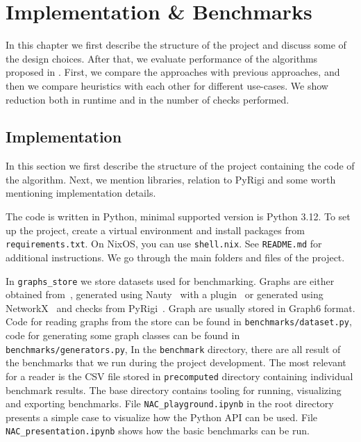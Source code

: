 \chapter{Implementation \& Benchmarks}%
\label{chapter:benchmarks}

\begin{chapterabstract}

	In this chapter we first describe the structure of the project
	and discuss some of the design choices.
	After that, we evaluate performance of the algorithms
	proposed in .
	First, we compare the approaches with previous approaches,
	and then we compare heuristics with each other
	for different use-cases.
	We show reduction both in runtime and in the number
	of \IsNACColoring{} checks performed.

\end{chapterabstract}

\section{Implementation}


In this section we first describe the structure of the project containing
the code of the algorithm.
Next, we mention libraries, relation to PyRigi and
some worth mentioning implementation details.

The code is written in Python, minimal supported version is Python 3.12.
To set up the project, create a virtual environment and install packages
from \texttt{requirements.txt}. On NixOS, you can use \texttt{shell.nix}.
See \texttt{README.md} for additional instructions.
We go through the main folders and files of the project.

In \texttt{graphs\_store} we store datasets used for benchmarking.
Graphs are either obtained from~\cite{extremal_graphs},
generated using Nauty~\cite{nauty} with a plugin~\cite{nauty_plugin}
or generated using NetworkX~\cite{networkx} and checks from PyRigi~\cite{pyrigi}.
Graph are usually stored in Graph6 format.
Code for reading graphs from the store can be found in \texttt{benchmarks/dataset.py},
code for generating some graph classes can be found in  \texttt{benchmarks/generators.py},
In the \texttt{benchmark} directory, there are all result of the benchmarks that we run
during the project development. The most relevant for a reader is the CSV file
stored in \texttt{precomputed} directory containing individual benchmark results.
The base directory contains tooling for running, visualizing and exporting benchmarks.
File \texttt{NAC\_playground.ipynb} in the root directory presents a simple case
to visualize how the Python API can be used.
File \texttt{NAC\_presentation.ipynb} shows how the basic benchmarks can be run.


